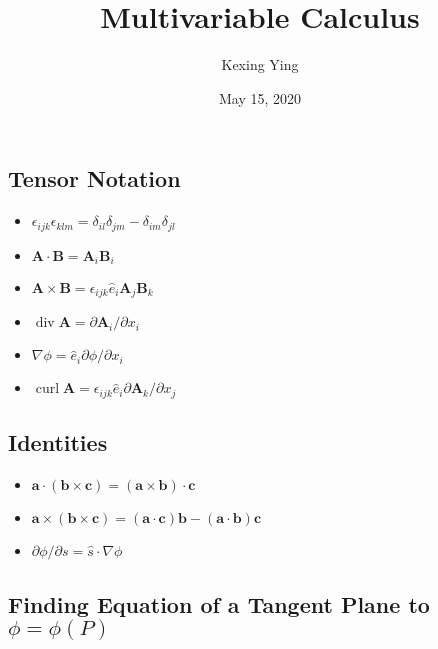 \documentclass[
]{article}
\title{Multivariable Calculus}
\author{Kexing Ying}
\date{May 15, 2020}
\theoremstyle{definition}
\theoremstyle{definition}
\begin{document}
\maketitle

\hypertarget{tensor-notation}{%
\subsection{Tensor Notation}\label{tensor-notation}}

\begin{itemize}
  \item \(\epsilon_{ijk}\epsilon_{klm} = \delta_{il}\delta_{jm} - \delta_{im}\delta_{jl}\)  
  \item \(\mathbf{A} \cdot \mathbf{B} = \mathbf{A}_i \mathbf{B}_i\)
  \item \(\mathbf{A} \times \mathbf{B} = \epsilon_{ijk}\hat{e}_i\mathbf{A}_j\mathbf{B}_k\)
  \item \(\mathop{\mathrm{div}}\mathbf{A} = \partial \mathbf{A}_i / \partial x_i\)
  \item \(\nabla \phi = \hat{e}_i \partial \phi / \partial x_i\)
  \item \(\mathop{\mathrm{curl}}\mathbf{A} = \epsilon_{ijk} \hat{e}_i \partial \mathbf{A}_k / \partial x_j\)
\end{itemize}

\hypertarget{identities}{%
\subsection{Identities}\label{identities}}

\begin{itemize}
  \item \(\mathbf{a} \cdot (\mathbf{b} \times \mathbf{c}) = (\mathbf{a} \times 
    \mathbf{b}) \cdot \mathbf{c}\)
  \item \(\mathbf{a} \times (\mathbf{b} \times \mathbf{c}) = (\mathbf{a} \cdot 
    \mathbf{c}) \mathbf{b} - (\mathbf{a} \cdot \mathbf{b})\mathbf{c}\)
  \item \(\partial \phi / \partial s = \hat{s} \cdot \nabla \phi\)
\end{itemize}

\hypertarget{finding-equation-of-a-tangent-plane-to-phi-phip}{%
\subsection{\texorpdfstring{Finding Equation of a Tangent Plane to
\(\phi = \phi(P)\)}{Finding Equation of a Tangent Plane to \textbackslash phi = \textbackslash phi(P)}}\label{finding-equation-of-a-tangent-plane-to-phi-phip}}
\end{document}
